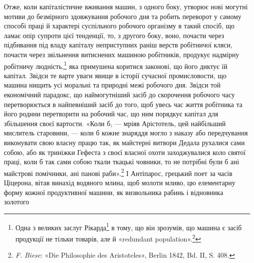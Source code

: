 Отже, коли капіталістичне вживання машин, з одного боку,
утворює нові могутні мотиви до безмірного здовжування робочого
дня та робить переворот у самому способі праці й характері суспільного
робочого організму в такий спосіб, що ламає опір супроти
цієї тенденції, то, з другого боку, воно, почасти через підбивання
під владу капіталу неприступних раніш верств робітничої кляси,
почасти через звільнення витиснених машиною робітників, продукує
надмірну робітничу людність,\footnote{
Одна з великих заслуг Рікарда\footnote*{
У французькому виданні тут сказано: «Одна з заслуг Сісмонді
та Рікарда в тому, що вони зрозуміли і~». \emph{Ред.}
} в тому, що він зрозумів, що
машина є засіб продукції не тільки товарів, але й «redundant
population».\footnote*{
— надмірної людности. \emph{Ред.}
}
} яка примушена коритися
законові, що його диктує їй капітал. Звідси те варте уваги явище в
історії сучасної промисловости, що машина нищить усі моральні та
природні межі робочого дня. Звідси той економічний парадокс, що
наймогутніший засіб до скорочення робочого часу перетворюється
в найпевніший засіб до того, щоб увесь час життя робітника та
його родини перетворити на робочий час, що ним порядкує капітал
для збільшення своєї вартости. «Коли б, — мріяв Арістотель,
цей найбільший мислитель старовини, — коли б кожне знаряддя
могло з наказу або передчування виконувати свою власну працю
так, як майстерні витвори Дедала рухалися сами собою, або як
триніжки Гефеста з своєї власної охоти заходжувалися коло святої
праці, коли б так сами собою ткали ткацькі човники, то не потрібні
були б ані майстрові помічники, ані панові раби».\footnote{
\emph{F. Biese}: «Die Philosophie des Aristoteles», Berlin 1842, Bd. II,
S. 408.
} І Антіпарос,
грецький поет за часів Ціцерона, вітав винахід водяного
млина, щоб молоти мливо, цю елементарну форму кожної
продуктивної машини, як визвольника рабинь і відновника золотого
